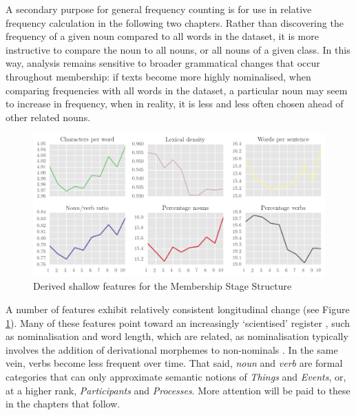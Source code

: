 A secondary purpose for general frequency counting is for use in relative frequency calculation in the following two chapters. Rather than discovering the frequency of a given noun compared to all words in the dataset, it is more instructive to compare the noun to all nouns, or all nouns of a given class. In this way, analysis remains sensitive to broader grammatical changes that occur throughout membership: if texts become more highly nominalised, when comparing frequencies with all words in the dataset, a particular noun may seem to increase in frequency, when in reality, it is less and less often chosen ahead of other related nouns.


\begin{figure}[htb]
\centering
\includegraphics[width=\textwidth]{../images/derived-shallow-features-in-p-corpus.png}
\caption{Derived shallow features for the Membership Stage Structure}
\label{fig:derived_shallow_P}
\end{figure}

A number of features exhibit relatively consistent longitudinal change (see Figure \ref{fig:derived_shallow_P}). Many of these features point toward an increasingly `scientised' register \cite{harvey_disclosures_2012}, such as nominalisation and word length, which are related, as nominalisation typically involves the addition of derivational morphemes to non\hyp{}nominals \cite{simon-vandenbergen_grammatical_2003}. In the same vein, verbs become less frequent over time. That said, \emph{noun} and \emph{verb} are formal categories that can only approximate semantic notions of \emph{Things} and \emph{Events}, or, at a higher rank, \emph{Participants} and \emph{Processes}. More attention will be paid to these in the chapters that follow.

